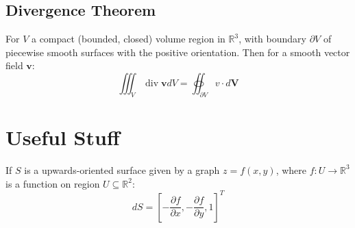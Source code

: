 \documentclass[a4paper]{article}
\newcommand{\RR}{\mathbb{R}}
\def\pp#1#2{\frac{\partial #1}{\partial #2}}
\def\divergence{\operatorname{div}}
\begin{document}
\begin{multicols}{2}
	\subsection*{Divergence Theorem}
	For $V$ a compact (bounded, closed) volume region in $\RR^3$, with boundary $\partial V$ of piecewise smooth surfaces with the positive orientation.  Then for a smooth vector field $\mathbf{v}$:
	$$
		\iiint_V\divergence \mathbf{v} dV = \oiint_{\partial V}v\cdot d\mathbf{V}
	$$

	\section*{Useful Stuff}
	If  $S$ is a upwards-oriented surface given by a graph $z=f(x,y)$, where $f:U\to\RR^3$ is a function on region $U\subseteq \RR^2$:
	$$dS=\left[ -\pp fx, -\pp fy, 1 \right]^T$$







\end{multicols}
\end{document}
